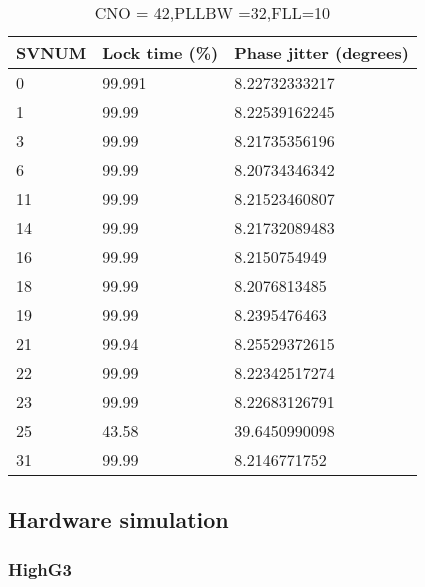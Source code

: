 \begin{table}[!htb]
\centering
\begin{tabular}{|l|l|l|}
\hline
\rowcolor[HTML]{C0C0C0} 
SVNUM & Lock time (\%) & Phase jitter (degrees) \\ \hline
0     & 99.991  & 8.22732333217          \\ \hline
\rowcolor[HTML]{EFEFEF} 
1     & 99.99  & 8.22539162245          \\ \hline
3     & 99.99  & 8.21735356196          \\ \hline
\rowcolor[HTML]{EFEFEF} 
6     & 99.99  & 8.20734346342          \\ \hline
11    & 99.99  & 8.21523460807          \\ \hline
\rowcolor[HTML]{EFEFEF} 
14    & 99.99  & 8.21732089483          \\ \hline
16    & 99.99  & 8.2150754949           \\ \hline
\rowcolor[HTML]{EFEFEF} 
18    & 99.99  & 8.2076813485           \\ \hline
19    & 99.99  & 8.2395476463           \\ \hline
\rowcolor[HTML]{EFEFEF} 
21    & 99.94  & 8.25529372615          \\ \hline
22    & 99.99  & 8.22342517274          \\ \hline
\rowcolor[HTML]{EFEFEF} 
23    & 99.99  & 8.22683126791          \\ \hline
25    & 43.58  & 39.6450990098          \\ \hline
\rowcolor[HTML]{EFEFEF} 
31    & 99.99  & 8.2146771752           \\ \hline
\end{tabular}
\caption{CNO = 42,PLLBW =32,FLL=10}
\label{my-label}
\end{table}

\clearpage
\subsection{Hardware simulation}

\subsubsection{HighG3}

